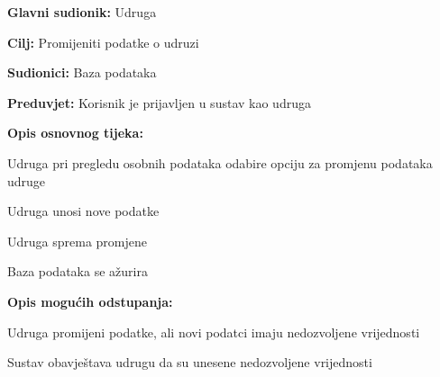 				
				\noindent {}
					\begin{packed_item}
	
						\item \textbf{Glavni sudionik:} Udruga
						\item  \textbf{Cilj:} Promijeniti podatke o udruzi
						\item  \textbf{Sudionici:} Baza podataka
						\item  \textbf{Preduvjet:} Korisnik je prijavljen u sustav kao udruga
						\item  \textbf{Opis osnovnog tijeka:}
						
						\item[] \begin{packed_enum}
	
							\item Udruga pri pregledu osobnih podataka odabire opciju za promjenu podataka udruge
							\item Udruga unosi nove podatke
							\item Udruga sprema promjene
							\item Baza podataka se ažurira
	
						\end{packed_enum}
						
						\item  \textbf{Opis mogućih odstupanja:}
						
						\item[] \begin{packed_item}
							\item[3.a] Udruga promijeni podatke, ali novi podatci imaju nedozvoljene vrijednosti
							\item[] \begin{packed_enum}
								\item Sustav obavještava udrugu da su unesene nedozvoljene vrijednosti
							\end{packed_enum}
						\end{packed_item}
					\end{packed_item}
				
				
				
